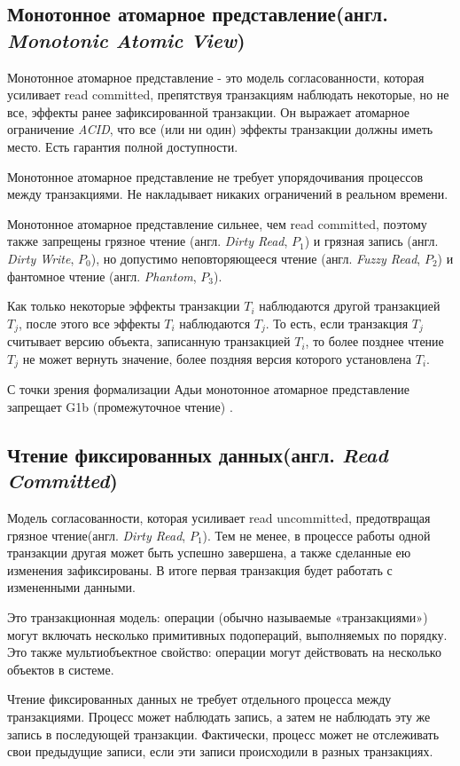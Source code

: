 \documentclass[12pt,  openany]{book}
\begin{document}
\subsection{Монотонное атомарное представление(англ.  \textit{Monotonic Atomic View})}
Монотонное атомарное представление - это модель согласованности, которая усиливает read committed, препятствуя транзакциям наблюдать некоторые, но не все, эффекты ранее зафиксированной транзакции. Он выражает атомарное ограничение \textit{ACID}, что все (или ни один) эффекты транзакции должны иметь место.  Есть гарантия полной доступности.
\par
Монотонное атомарное представление не требует упорядочивания процессов между транзакциями. Не накладывает никаких ограничений в реальном времени.
\par
Монотонное атомарное представление сильнее, чем  read committed, поэтому также запрещены грязное чтение (англ.  \textit{Dirty Read},  $P_1$) и грязная запись (англ. \textit{Dirty Write}, $P_0$), но допустимо неповторяющееся чтение (англ. \textit{Fuzzy Read}, $P_2$) и фантомное чтение (англ. \textit{Phantom}, $P_3$).
\par
Как только некоторые эффекты транзакции $T_i$ наблюдаются другой транзакцией $T_j$, после этого все эффекты $T_i$ наблюдаются $T_j$. То есть, если транзакция $T_j$ считывает версию объекта, записанную транзакцией $T_i$, то более позднее чтение $T_j$ не может вернуть значение, более поздняя версия которого установлена $T_i$.
\par
С точки зрения формализации Адьи монотонное атомарное представление запрещает G1b (промежуточное чтение) \cite{adya99:_weak_consis}.

\subsection{Чтение фиксированных данных(англ.  \textit{Read Committed})}
Модель согласованности, которая усиливает read uncommitted, предотвращая грязное чтение(англ.  \textit{Dirty Read},  $P_1$). Тем не менее, в процессе работы одной транзакции другая может быть успешно завершена, а также сделанные ею изменения зафиксированы. В итоге первая транзакция будет работать с  измененными данными.
\par
Это транзакционная модель: операции (обычно называемые «транзакциями») могут включать несколько примитивных подопераций, выполняемых по порядку. Это также  мультиобъектное свойство: операции могут действовать на несколько объектов в системе.
\par
Чтение фиксированных данных не требует отдельного процесса между транзакциями. Процесс может наблюдать запись, а затем не наблюдать эту же запись в последующей транзакции. Фактически, процесс может не отслеживать свои предыдущие записи, если эти записи происходили в разных транзакциях.
\end{document}
